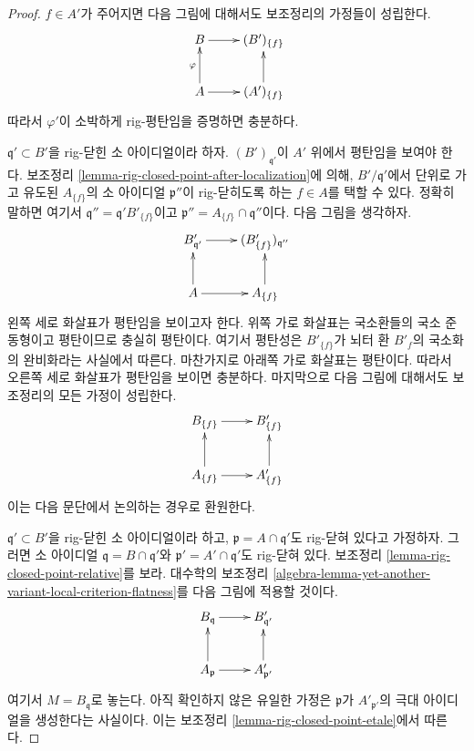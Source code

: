 \begin{proof}
$f \in A'$가 주어지면 다음 그림에 대해서도 보조정리의 가정들이 성립한다.
$$
\xymatrix{
B \ar[r] & (B')_{\{f\}} \\
A \ar[r] \ar[u]^\varphi & (A')_{\{f\}} \ar[u]
}
$$
따라서 $\varphi'$이 소박하게 rig-평탄임을 증명하면 충분하다.

\medskip\noindent
$\mathfrak q' \subset B'$을 rig-닫힌 소 아이디얼이라 하자.
$(B')_{\mathfrak q'}$이 $A'$ 위에서 평탄임을 보여야 한다.
보조정리 \ref{lemma-rig-closed-point-after-localization}에 의해,
$B'/\mathfrak q'$에서 단위로 가고 유도된 $A_{\{f\}}$의 소 아이디얼
$\mathfrak p''$이 rig-닫히도록 하는 $f \in A$를 택할 수 있다.
정확히 말하면 여기서 $\mathfrak q'' = \mathfrak q' B'_{\{f\}}$이고
$\mathfrak p'' = A_{\{f\}} \cap \mathfrak q''$이다. 다음 그림을 생각하자.
$$
\xymatrix{
B'_{\mathfrak q'} \ar[r] &
(B'_{\{f\}})_{\mathfrak q''} \\
A \ar[r] \ar[u] &
A_{\{f\}} \ar[u]
}
$$
왼쪽 세로 화살표가 평탄임을 보이고자 한다.
위쪽 가로 화살표는 국소환들의 국소 준동형이고 평탄이므로 충실히 평탄이다.
여기서 평탄성은 $B'_{\{f\}}$가 뇌터 환 $B'_f$의 국소화의 완비화라는
사실에서 따른다. 마찬가지로 아래쪽 가로 화살표는 평탄이다.
따라서 오른쪽 세로 화살표가 평탄임을 보이면 충분하다.
마지막으로 다음 그림에 대해서도 보조정리의 모든 가정이 성립한다.
$$
\xymatrix{
B_{\{f\}} \ar[r] &
B'_{\{f\}} \\
A_{\{f\}} \ar[r] \ar[u] &
A'_{\{f\}} \ar[u]
}
$$
이는 다음 문단에서 논의하는 경우로 환원한다.

\medskip\noindent
$\mathfrak q' \subset B'$을 rig-닫힌 소 아이디얼이라 하고,
$\mathfrak p = A \cap \mathfrak q'$도 rig-닫혀 있다고 가정하자.
그러면 소 아이디얼 $\mathfrak q = B \cap \mathfrak q'$와
$\mathfrak p' = A' \cap \mathfrak q'$도 rig-닫혀 있다.
보조정리 \ref{lemma-rig-closed-point-relative}를 보라.
대수학의 보조정리
\ref{algebra-lemma-yet-another-variant-local-criterion-flatness}를
다음 그림에 적용할 것이다.
$$
\xymatrix{
B_\mathfrak q \ar[r] &
B'_{\mathfrak q'} \\
A_\mathfrak p \ar[u] \ar[r] &
A'_{\mathfrak p'} \ar[u]
}
$$
여기서 $M = B_\mathfrak q$로 놓는다. 아직 확인하지 않은 유일한 가정은
$\mathfrak p$가 $A'_{\mathfrak p'}$의 극대 아이디얼을 생성한다는 사실이다.
이는 보조정리 \ref{lemma-rig-closed-point-etale}에서 따른다.
\end{proof}


